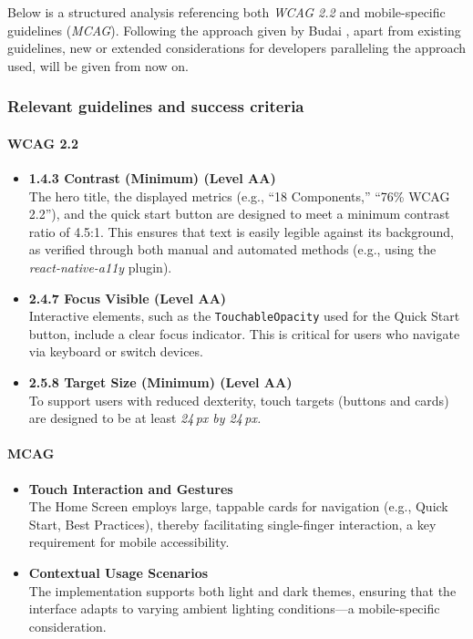 Below is a structured analysis referencing both \textit{WCAG 2.2} and mobile-specific guidelines (\textit{MCAG}). Following the approach given by Budai \cite{budai2024mobile}, apart from existing guidelines, new or extended considerations for developers paralleling the approach used, will be given from now on.

\subsubsection{Relevant guidelines and success criteria}

\paragraph{WCAG 2.2}
\begin{itemize}
    \item \textbf{1.4.3 Contrast (Minimum) (Level AA)}\\ 
    The hero title, the displayed metrics (e.g., ``18 Components,'' ``76\% WCAG 2.2''), and the quick start button are designed to meet a minimum contrast ratio of 4.5:1. This ensures that text is easily legible against its background, as verified through both manual and automated methods (e.g., using the \textit{react-native-a11y} plugin).
    
    \item \textbf{2.4.7 Focus Visible (Level AA)}\\ 
    Interactive elements, such as the \texttt{TouchableOpacity} used for the Quick Start button, include a clear focus indicator. This is critical for users who navigate via keyboard or switch devices.
    
    \item \textbf{2.5.8 Target Size (Minimum) (Level AA)}\\ 
    To support users with reduced dexterity, touch targets (buttons and cards) are designed to be at least \textit{24\,px by 24\,px.}
\end{itemize}

\paragraph{MCAG}
\begin{itemize}
    \item \textbf{Touch Interaction and Gestures}\\ 
    The Home Screen employs large, tappable cards for navigation (e.g., Quick Start, Best Practices), thereby facilitating single-finger interaction, a key requirement for mobile accessibility.
    
    \item \textbf{Contextual Usage Scenarios}\\ 
    The implementation supports both light and dark themes, ensuring that the interface adapts to varying ambient lighting conditions—a mobile-specific consideration.
\end{itemize}

